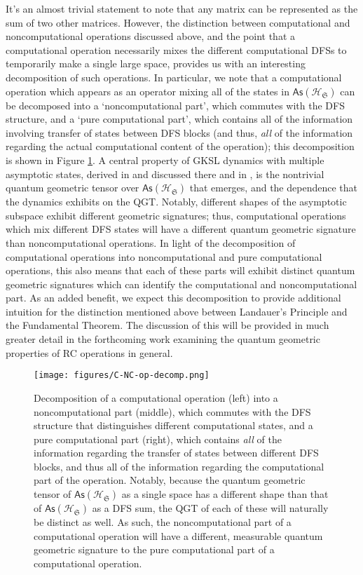 \documentclass[preprints,article,accept,moreauthors,pdftex]{Definitions/mdpi}
\begin{document}
\begin{paracol}{2}
It's an almost trivial statement to note that any matrix can be represented as the sum of two other matrices. However, the distinction between computational and noncomputational operations discussed above, and the point that a computational operation necessarily mixes the different computational DFSs to temporarily make a single large space, provides us with an interesting decomposition of such operations. In particular, we note that a computational operation which appears as an operator mixing all of the states in $\mathsf{As}\left(\mathcal{H}_{\mathfrak{S}}\right)$ can be decomposed into a `noncomputational part', which commutes with the DFS structure, and a `pure computational part', which contains all of the information involving transfer of states between DFS blocks (and thus, \emph{all} of the information regarding the actual computational content of the operation); this decomposition is shown in Figure \ref{fig:c-nc-decomp}. A central property of GKSL dynamics with multiple asymptotic states, derived in \cite{ABFJ16} and discussed there and in \cite{Albert18}, is the nontrivial quantum geometric tensor over $\mathsf{As}\left(\mathcal{H}_{\mathfrak{S}}\right)$ that emerges, and the dependence that the dynamics exhibits on the QGT. Notably, different shapes of the asymptotic subspace exhibit different geometric signatures; thus, computational operations which mix different DFS states will have a different quantum geometric signature than noncomputational operations. In light of the decomposition of computational operations into noncomputational and pure computational operations, this also means that each of these parts will exhibit distinct quantum geometric signatures which can identify the computational and noncomputational part. As an added benefit, we expect this decomposition to provide additional intuition for the distinction mentioned above between Landauer's Principle and the Fundamental Theorem. The discussion of this will be provided in much greater detail in the forthcoming work examining the quantum geometric properties of RC operations in general.

\end{paracol}
\begin{figure}[h]
\widefigure
    \centerline{\texttt{[image: figures/C-NC-op-decomp.png]}}
    \caption{Decomposition of a computational operation (left) into a noncomputational part (middle), which commutes with the DFS structure that distinguishes different computational states, and a pure computational part (right), which contains \emph{all} of the information regarding the transfer of states between different DFS blocks, and thus all of the information regarding the computational part of the operation. Notably, because the quantum geometric tensor of $\mathsf{As}\left(\mathcal{H}_{\mathfrak{S}}\right)$ as a single space has a different shape than that of $\mathsf{As}\left(\mathcal{H}_{\mathfrak{S}}\right)$ as a DFS sum, the QGT of each of these will naturally be distinct as well. As such, the noncomputational part of a computational operation will have a different, measurable quantum geometric signature to the pure computational part of a computational operation. \label{fig:c-nc-decomp}}
\end{figure}
\end{document}
